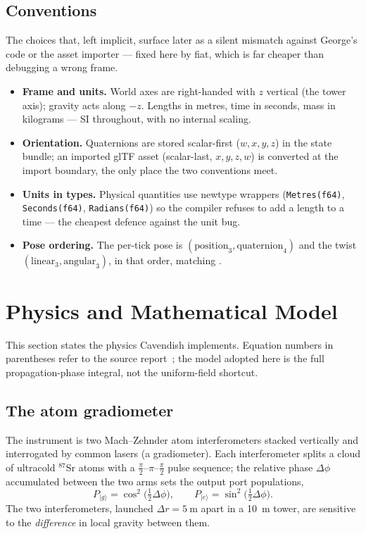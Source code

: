\documentclass[11pt,a4paper]{article}
\theoremstyle{reqstyle}
\begin{document}
\subsection{Conventions}
\label{sec:conventions}
The choices that, left implicit, surface later as a silent mismatch against George's code or
the asset importer --- fixed here by fiat, which is far cheaper than debugging a wrong frame.
\begin{itemize}[leftmargin=*,nosep]
\item \textbf{Frame and units.} World axes are right-handed with $z$ vertical (the tower
axis); gravity acts along $-z$. Lengths in metres, time in seconds, mass in kilograms --- SI
throughout, with no internal scaling.
\item \textbf{Orientation.} Quaternions are stored scalar-first ($w,x,y,z$) in the state
bundle; an imported glTF asset (scalar-last, $x,y,z,w$) is converted at the import boundary,
the only place the two conventions meet.
\item \textbf{Units in types.} Physical quantities use newtype wrappers
(\texttt{Metres(f64)}, \texttt{Seconds(f64)}, \texttt{Radians(f64)}) so the compiler refuses
to add a length to a time --- the cheapest defence against the unit bug.
\item \textbf{Pose ordering.} The per-tick pose is $(\text{position}_3,
\text{quaternion}_4)$ and the twist $(\text{linear}_3, \text{angular}_3)$, in that order,
matching .
\end{itemize}

\section{Physics and Mathematical Model}
\label{sec:physics}

This section states the physics Cavendish implements. Equation numbers in parentheses
refer to the source report~\cite{parish2026}; the model adopted here is the full
propagation-phase integral, not the uniform-field shortcut.

\subsection{The atom gradiometer}
The instrument is two Mach--Zehnder atom interferometers stacked vertically and
interrogated by common lasers (a gradiometer). Each interferometer splits a cloud of
ultracold $^{87}$Sr atoms with a $\tfrac{\pi}{2}$--$\pi$--$\tfrac{\pi}{2}$ pulse sequence;
the relative phase $\Delta\phi$ accumulated between the two arms sets the output port
populations,
\begin{equation}
P_{|g\rangle} = \cos^2\!\Big(\tfrac{1}{2}\Delta\phi\Big),
\qquad
P_{|e\rangle} = \sin^2\!\Big(\tfrac{1}{2}\Delta\phi\Big).
\end{equation}
The two interferometers, launched $\Delta r = \SI{5}{\metre}$ apart in a \SI{10}{\metre}
tower, are sensitive to the \emph{difference} in local gravity between them.
\end{document}
